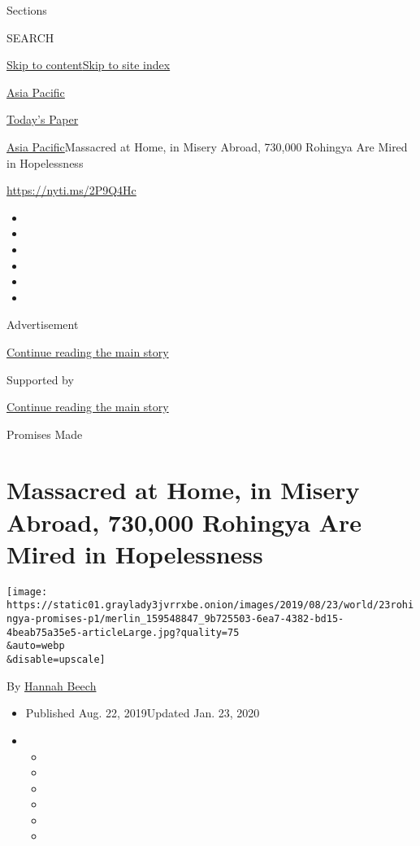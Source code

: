 Sections

SEARCH

\protect\hyperlink{site-content}{Skip to
content}\protect\hyperlink{site-index}{Skip to site index}

\href{https://www.nytimes3xbfgragh.onion/section/world/asia}{Asia
Pacific}

\href{https://myaccount.nytimes3xbfgragh.onion/auth/login?response_type=cookie\&client_id=vi}{}

\href{https://www.nytimes3xbfgragh.onion/section/todayspaper}{Today's
Paper}

\href{/section/world/asia}{Asia Pacific}\textbar{}Massacred at Home, in
Misery Abroad, 730,000 Rohingya Are Mired in Hopelessness

\url{https://nyti.ms/2P9Q4Hc}

\begin{itemize}
\item
\item
\item
\item
\item
\item
\end{itemize}

Advertisement

\protect\hyperlink{after-top}{Continue reading the main story}

Supported by

\protect\hyperlink{after-sponsor}{Continue reading the main story}

Promises Made

\hypertarget{massacred-at-home-in-misery-abroad-730000-rohingya-are-mired-in-hopelessness}{%
\section{Massacred at Home, in Misery Abroad, 730,000 Rohingya Are Mired
in
Hopelessness}\label{massacred-at-home-in-misery-abroad-730000-rohingya-are-mired-in-hopelessness}}

\texttt{[image: https://static01.graylady3jvrrxbe.onion/images/2019/08/23/world/23rohingya-promises-p1/merlin\_159548847\_9b725503-6ea7-4382-bd15-4beab75a35e5-articleLarge.jpg?quality=75\\\&auto=webp\\\&disable=upscale]}

By \href{https://www.nytimes3xbfgragh.onion/by/hannah-beech}{Hannah
Beech}

\begin{itemize}
\item
  Published Aug. 22, 2019Updated Jan. 23, 2020
\item
  \begin{itemize}
  \item
  \item
  \item
  \item
  \item
  \item
  \end{itemize}
\end{itemize}

